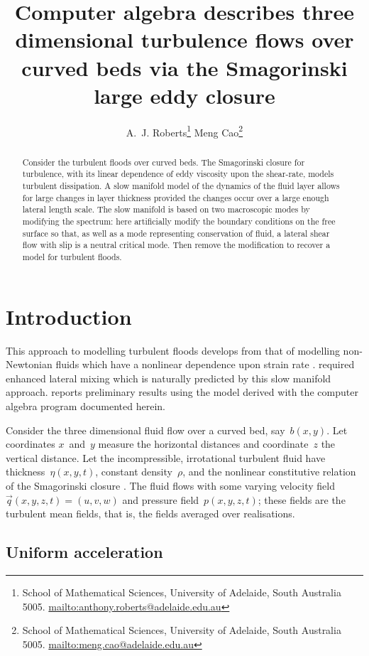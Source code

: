 \documentclass[12pt,a5paper]{article}
\title{Computer algebra describes three dimensional turbulence flows over curved beds via the Smagorinski large eddy closure}
\author{A.~J. Roberts\thanks{School of Mathematical Sciences,
University of Adelaide, South Australia 5005.  \protect\url{mailto:anthony.roberts@adelaide.edu.au}}
\qquad 
Meng Cao\thanks{School of Mathematical Sciences,
University of Adelaide, South Australia 5005.  \protect\url{mailto:meng.cao@adelaide.edu.au}}}
\begin{document}
    
\maketitle
    
\begin{abstract}
Consider the turbulent floods over curved beds.  The Smagorinski closure for turbulence, with its linear dependence of eddy viscosity upon the shear-rate, models turbulent dissipation.  A slow manifold model of the dynamics of the fluid layer allows for large changes in layer thickness provided the changes occur over a large enough lateral length scale.  The slow manifold is based on two macroscopic modes by modifying the spectrum: here artificially modify the boundary conditions on the free surface so that, as well as a mode representing conservation of fluid, a lateral shear flow with slip is a neutral critical mode.  Then remove the modification to recover a model for turbulent floods.  \end{abstract}

\tableofcontents




\section{Introduction}

This approach to modelling turbulent floods develops from that of modelling non-Newtonian fluids which have a nonlinear dependence upon strain rate \cite[]{Roberts07a, Roberts07b}. \cite{Bijvelds99} required enhanced lateral mixing which is naturally predicted by this slow manifold approach. \cite{Roberts08f} reports preliminary results using the model derived with the computer algebra program documented herein.

Consider the three dimensional fluid flow over a curved bed, say~$b(x,y)$.  Let coordinates $x$~and~$y$ measure the horizontal distances and coordinate~$z$ the vertical distance. Let the incompressible, irrotational turbulent fluid have thickness~$\eta(x,y,t)$, constant density~$\rho$, and the nonlinear constitutive relation of the Smagorinski closure \cite[e.g.]{Kim02, Marstop06, Ozgokmen07}.  The fluid flows with some varying velocity field $\vec q(x,y,z,t)=(u,v,w)$ and pressure field~$p(x,y,z,t)$; these fields are the turbulent mean fields, that is, the fields averaged over realisations.


\subsection{Uniform acceleration}
\end{document}
